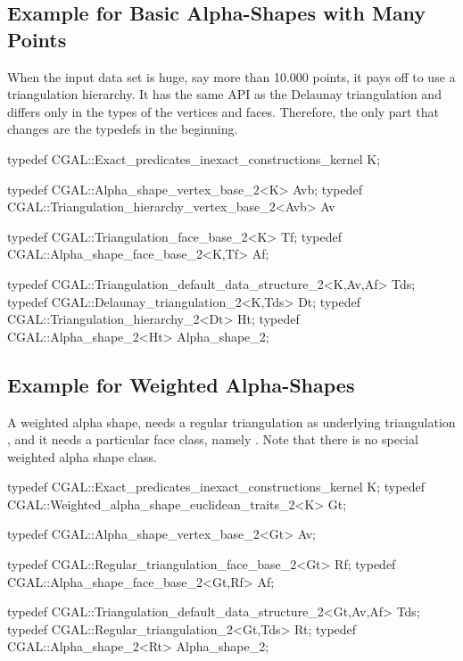 \subsection{Example for Basic Alpha-Shapes with Many Points
         \label{I1_SectClassicAS2DHier}}

When the input data set is huge, say more than 10.000 points, it pays
off to use a triangulation hierarchy. It has the same API as the
Delaunay triangulation and differs only in the types of the vertices
and faces. Therefore, the only part that changes are the typedefs in the beginning.

\begin{cprog}
typedef CGAL::Exact_predicates_inexact_constructions_kernel K;

typedef CGAL::Alpha_shape_vertex_base_2<K> Avb;
typedef CGAL::Triangulation_hierarchy_vertex_base_2<Avb> Av 

typedef CGAL::Triangulation_face_base_2<K> Tf;
typedef CGAL::Alpha_shape_face_base_2<K,Tf> Af;

typedef CGAL::Triangulation_default_data_structure_2<K,Av,Af> Tds;
typedef CGAL::Delaunay_triangulation_2<K,Tds> Dt;
typedef CGAL::Triangulation_hierarchy_2<Dt> Ht;
typedef CGAL::Alpha_shape_2<Ht> Alpha_shape_2;
\end{cprog}



\subsection{Example for Weighted Alpha-Shapes\label{I1_SectWeightedAS2D}}

A weighted alpha shape, needs a regular triangulation as
underlying triangulation , and it needs a particular
face class, namely .
Note that there is no special weighted alpha shape class.

\begin{cprog}
typedef CGAL::Exact_predicates_inexact_constructions_kernel K;
typedef CGAL::Weighted_alpha_shape_euclidean_traits_2<K> Gt;

typedef CGAL::Alpha_shape_vertex_base_2<Gt> Av;

typedef CGAL::Regular_triangulation_face_base_2<Gt> Rf;
typedef CGAL::Alpha_shape_face_base_2<Gt,Rf>  Af;

typedef CGAL::Triangulation_default_data_structure_2<Gt,Av,Af> Tds;
typedef CGAL::Regular_triangulation_2<Gt,Tds> Rt;
typedef CGAL::Alpha_shape_2<Rt> Alpha_shape_2;
\end{cprog}
